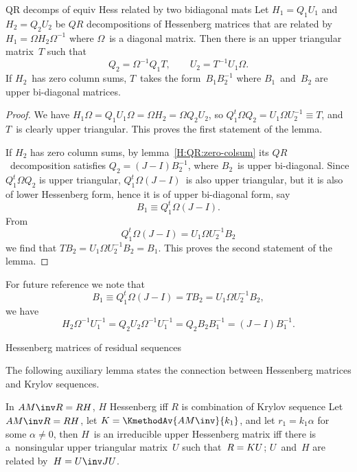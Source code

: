 \begin{llemma}{QR decomps of equiv Hess related by two bidiagonal mats}
\label{lemma:HQR-scale}
Let $H_1=Q_1U_1$ and $H_2=Q_2U_2$ be $QR$ decompositions of
Hessenberg matrices that are related by $H_1=\Omega H_2\Omega^{-1}$
where $\Omega$~is a diagonal matrix. Then there is an upper triangular
matrix~$T$ such that
\[ Q_2=\Omega^{-1}Q_1T,\qquad U_2=T^{-1}U_1\Omega. \]
If $H_2$~has zero column sums, $T$~takes the form~$B_1B_2^{-1}$ where
$B_1$~and~$B_2$ are upper bi-diagonal matrices.
\end{llemma}
\begin{proof} We have $H_1\Omega=Q_1U_1\Omega=\Omega H_2=\Omega Q_2U_2$,
so $Q_1^t\Omega Q_2=U_1\Omega U_2^{-1}\equiv T$, and $T$~is clearly
upper triangular. This proves the first statement of the lemma.

If $H_2$ has zero column sums, by lemma~\ref{H:QR:zero-colsum} its
$QR$~decomposition satisfies $Q_2=(J-I)B_2^{-1}$,
where $B_2$~is upper bi-diagonal.
Since $Q_1^t\Omega Q_2$ is upper triangular, $Q_1^t\Omega(J-I)$~is
also upper triangular, but it is also of lower Hessenberg form,
hence it is of upper bi-diagonal form, say
\begin{equation}
        B_1\equiv Q_1^t\Omega(J-I).
        \label{eq:B1-def}\end{equation}
From 
\[ Q_1^t\Omega(J-I)=U_1\Omega U_2^{-1}B_2 \]
we find that $TB_2=U_1\Omega U_2^{-1}B_2=B_1$.
This proves the second statement of the lemma.\end{proof}

For future reference we note that
\[ B_1\equiv Q_1^t\Omega(J-I)=TB_2=U_1\Omega U_2^{-1}B_2, \]
we have
\begin{equation}
        H_2\Omega^{-1}U_1^{-1}=Q_2U_2\Omega^{-1}U_1^{-1}
                =Q_2B_2B_1^{-1}=(J-I)B_1^{-1}.
        \label{eq:H-Om-U}\end{equation} 

 {Hessenberg matrices of residual sequences}
\label{sec:hess-res}

The following auxiliary lemma states the connection between Hessenberg
matrices and Krylov sequences.

\begin{llemma}{In $AM\inv R=RH$, $H$ Hessenberg
iff $R$ is combination of Krylov sequence}
\label{Hess-Krylov}
Let $AM\inv R=RH$, let $K=\KmethodAv{AM\inv}{k_1}$, and let
$r_1= k_1\alpha$ for some $\alpha\not=0$,
then $H$~is an irreducible upper Hessenberg matrix
iff there is a~nonsingular upper triangular matrix~$U$ such
that~$R=\nobreak KU$; $U$~and~$H$ are related by~$H=U\inv JU$.
\end{llemma}

